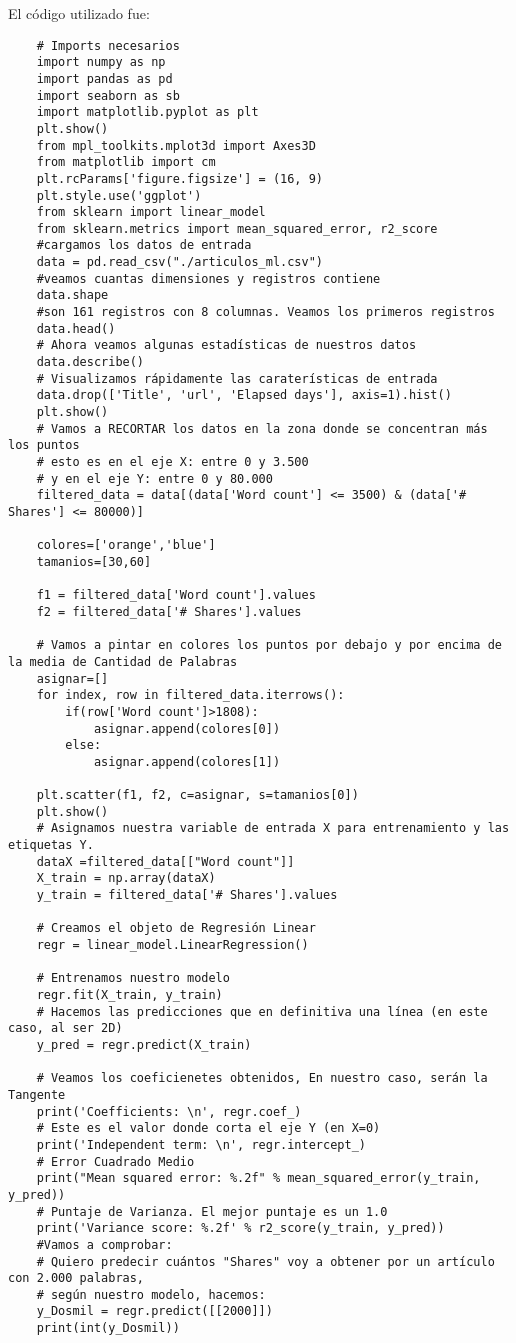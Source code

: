 \documentclass{article}
\begin{document}
El código utilizado fue:

\begin{verbatim}
    # Imports necesarios
    import numpy as np
    import pandas as pd
    import seaborn as sb
    import matplotlib.pyplot as plt
    plt.show()
    from mpl_toolkits.mplot3d import Axes3D
    from matplotlib import cm
    plt.rcParams['figure.figsize'] = (16, 9)
    plt.style.use('ggplot')
    from sklearn import linear_model
    from sklearn.metrics import mean_squared_error, r2_score
    #cargamos los datos de entrada
    data = pd.read_csv("./articulos_ml.csv")
    #veamos cuantas dimensiones y registros contiene
    data.shape
    #son 161 registros con 8 columnas. Veamos los primeros registros
    data.head()
    # Ahora veamos algunas estadísticas de nuestros datos
    data.describe()
    # Visualizamos rápidamente las caraterísticas de entrada
    data.drop(['Title', 'url', 'Elapsed days'], axis=1).hist()
    plt.show()
    # Vamos a RECORTAR los datos en la zona donde se concentran más los puntos
    # esto es en el eje X: entre 0 y 3.500
    # y en el eje Y: entre 0 y 80.000
    filtered_data = data[(data['Word count'] <= 3500) & (data['# Shares'] <= 80000)]
    
    colores=['orange','blue']
    tamanios=[30,60]
    
    f1 = filtered_data['Word count'].values
    f2 = filtered_data['# Shares'].values
    
    # Vamos a pintar en colores los puntos por debajo y por encima de la media de Cantidad de Palabras
    asignar=[]
    for index, row in filtered_data.iterrows():
        if(row['Word count']>1808):
            asignar.append(colores[0])
        else:
            asignar.append(colores[1])
    
    plt.scatter(f1, f2, c=asignar, s=tamanios[0])
    plt.show()
    # Asignamos nuestra variable de entrada X para entrenamiento y las etiquetas Y.
    dataX =filtered_data[["Word count"]]
    X_train = np.array(dataX)
    y_train = filtered_data['# Shares'].values
    
    # Creamos el objeto de Regresión Linear
    regr = linear_model.LinearRegression()
    
    # Entrenamos nuestro modelo
    regr.fit(X_train, y_train)
    # Hacemos las predicciones que en definitiva una línea (en este caso, al ser 2D)
    y_pred = regr.predict(X_train)
    
    # Veamos los coeficienetes obtenidos, En nuestro caso, serán la Tangente
    print('Coefficients: \n', regr.coef_)
    # Este es el valor donde corta el eje Y (en X=0)
    print('Independent term: \n', regr.intercept_)
    # Error Cuadrado Medio
    print("Mean squared error: %.2f" % mean_squared_error(y_train, y_pred))
    # Puntaje de Varianza. El mejor puntaje es un 1.0
    print('Variance score: %.2f' % r2_score(y_train, y_pred))
    #Vamos a comprobar:
    # Quiero predecir cuántos "Shares" voy a obtener por un artículo con 2.000 palabras,
    # según nuestro modelo, hacemos:
    y_Dosmil = regr.predict([[2000]])
    print(int(y_Dosmil))
\end{verbatim}
\end{document}
